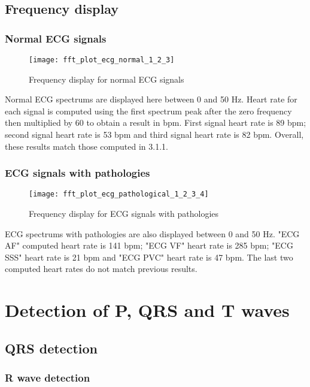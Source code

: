 \documentclass[11pt]{article}
\begin{document}
	\subsection{Frequency display}
	
	\subsubsection{Normal ECG signals}
	
	\begin{figure}[H]
	\centering
	\texttt{[image: fft\_plot\_ecg\_normal\_1\_2\_3]}
	\caption{Frequency display for normal ECG signals}
	\end{figure}
	
	Normal ECG spectrums are displayed here between 0 and 50 Hz. Heart rate for each signal is computed using the first spectrum peak after the zero frequency then multiplied by 60 to obtain a result in bpm. First signal heart rate is 89 bpm; second signal heart rate is 53 bpm and third signal heart rate is 82 bpm.
Overall, these results match those computed in 3.1.1.
	
	\subsubsection{ECG signals with pathologies}
	
	\begin{figure}[H]
	\centering
	\texttt{[image: fft\_plot\_ecg\_pathological\_1\_2\_3\_4]}
	\caption{Frequency display for ECG signals with pathologies}
	\end{figure}
	
ECG spectrums with pathologies are also displayed between 0 and 50 Hz. "ECG AF" computed heart rate is 141 bpm; "ECG VF" heart rate is 285 bpm; "ECG SSS" heart rate is 21 bpm and "ECG PVC" heart rate is 47 bpm. The last two computed heart rates do not match previous results.
	
	\section{Detection of P, QRS and T waves}
	
	\subsection{QRS detection}
	
	\subsubsection{R wave detection}
	
\end{document}
